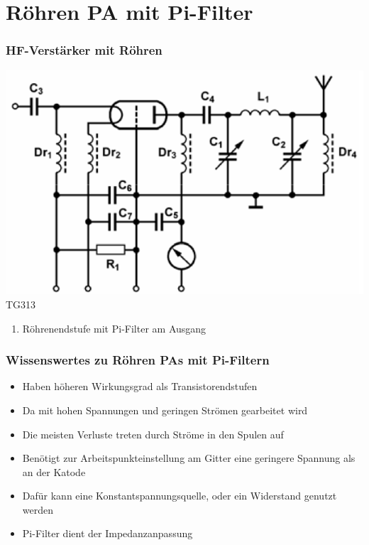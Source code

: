 

\subtitle{Technik A17: \\
           Schaltungstechnik \\[2em]}
\date{Stand 22.06.2015}


\section*{Röhren PA mit Pi-Filter}
\begin{frame}
    \frametitle{HF-Verstärker mit Röhren}
    \begin{center}
        \includegraphics[width=1\textwidth]{a17/TG313.png}\\
        \tiny TG313 \hyperlink{refs}{\cite{bna}}
     	\begin{enumerate} \Large
			\item Röhrenendstufe mit Pi-Filter am Ausgang
    	\end{enumerate}
    \end{center}
\end{frame}

\begin{frame}
\frametitle{Wissenswertes zu Röhren PAs mit Pi-Filtern}
\begin{center}
\begin{itemize}
	\item	Haben höheren Wirkungsgrad als Transistorendstufen
	\item	Da mit hohen Spannungen und geringen Strömen gearbeitet wird
	\item	Die meisten Verluste treten durch Ströme in den Spulen auf
	\item	Benötigt zur Arbeitspunkteinstellung am Gitter eine geringere Spannung als an der Katode
	\item	Dafür kann eine Konstantspannungsquelle, oder ein Widerstand genutzt werden
	\item	Pi-Filter dient der Impedanzanpassung
\end{itemize}
\end{center}
\end{frame}

